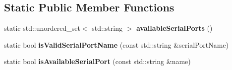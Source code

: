 \subsection*{Static Public Member Functions}
\begin{DoxyCompactItemize}
\item 
\mbox{\label{class_cpp_serial_port_1_1_serial_port_a0f7b939f57e91bd7f9ca8bce0b90a118}} 
static std\+::unordered\+\_\+set$<$ std\+::string $>$ {\bfseries available\+Serial\+Ports} ()
\item 
\mbox{\label{class_cpp_serial_port_1_1_serial_port_aacc6ad3a34fe8b998858db42353ba8e5}} 
static bool {\bfseries is\+Valid\+Serial\+Port\+Name} (const std\+::string \&serial\+Port\+Name)
\item 
\mbox{\label{class_cpp_serial_port_1_1_serial_port_a7410880357c66fa7d742a66865c85055}} 
static bool {\bfseries is\+Available\+Serial\+Port} (const std\+::string \&name)
\end{DoxyCompactItemize}
